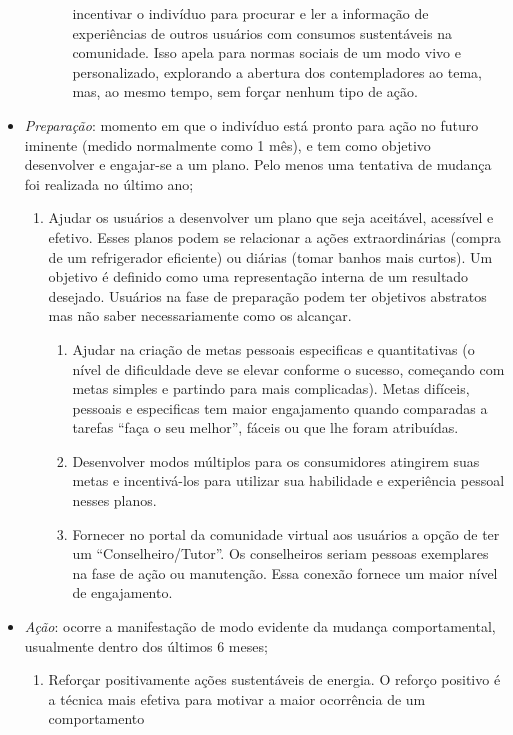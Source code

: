 \begin{itemize}
\begin{enumerate}
\begin{enumerate}
incentivar o indivíduo para procurar e ler a informação de experiências de
outros usuários com consumos sustentáveis na comunidade. Isso apela para normas
sociais de um modo vivo e personalizado, explorando a abertura dos
contempladores ao tema, mas, ao mesmo tempo, sem forçar nenhum tipo de ação.
\end{enumerate}
\end{enumerate}
\item \emph{Preparação}: momento em que o indivíduo está pronto para ação no
futuro iminente (medido normalmente como 1 mês), e tem como objetivo desenvolver
e engajar-se a um plano. Pelo menos uma tentativa de mudança foi realizada no
último ano;
\begin{enumerate}
\item Ajudar os usuários a desenvolver um plano que seja aceitável, acessível e
efetivo. Esses planos podem se relacionar a ações extraordinárias (compra de um
refrigerador eficiente) ou diárias (tomar banhos mais curtos). Um objetivo é
definido como uma representação interna de um resultado desejado. Usuários na
fase de preparação podem ter objetivos abstratos mas não saber necessariamente
como os alcançar.
\begin{enumerate}
\item Ajudar na criação de metas pessoais especificas e quantitativas
(o nível de dificuldade deve se elevar conforme o sucesso, começando com metas 
simples e partindo para mais complicadas). Metas difíceis, pessoais e
especificas tem maior engajamento quando comparadas a tarefas ``faça o seu
melhor'', fáceis ou que lhe foram atribuídas.
\item Desenvolver modos múltiplos para os consumidores atingirem suas metas e
incentivá-los para utilizar sua habilidade e experiência pessoal nesses planos.
\item Fornecer no portal da comunidade virtual aos usuários a opção de ter
um ``Conselheiro/Tutor''. Os conselheiros seriam pessoas exemplares na
fase de ação ou manutenção. Essa conexão fornece um maior nível de
engajamento. 
\end{enumerate}
\end{enumerate}
\item \emph{Ação}: ocorre a manifestação de modo evidente da mudança
comportamental, usualmente dentro dos últimos 6 meses;
\begin{enumerate}
\item Reforçar positivamente ações sustentáveis de energia. O reforço positivo é
a técnica mais efetiva para motivar a maior ocorrência de um comportamento

\end{enumerate}
\end{itemize}
